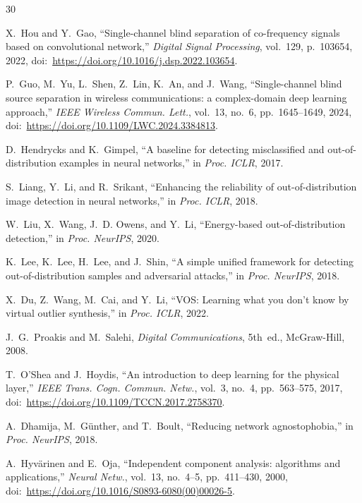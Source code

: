 \documentclass[review,12pt]{elsarticle}
\begin{document}
\begin{thebibliography}{30}\footnotesize

X.~Hou and Y.~Gao,
``Single-channel blind separation of co-frequency signals based on
convolutional network,''
\emph{Digital Signal Processing}, vol.~129, p.~103654, 2022,
doi:~\url{https://doi.org/10.1016/j.dsp.2022.103654}.

P.~Guo, M.~Yu, L.~Shen, Z.~Lin, K.~An, and J.~Wang,
``Single-channel blind source separation in wireless communications: a
complex-domain deep learning approach,''
\emph{IEEE Wireless Commun. Lett.}, vol.~13, no.~6, pp.~1645--1649,
2024, doi:~\url{https://doi.org/10.1109/LWC.2024.3384813}.

D.~Hendrycks and K.~Gimpel,
``A baseline for detecting misclassified and out-of-distribution
examples in neural networks,''
in \emph{Proc. ICLR}, 2017.

S.~Liang, Y.~Li, and R.~Srikant,
``Enhancing the reliability of out-of-distribution image detection in
neural networks,''
in \emph{Proc. ICLR}, 2018.

W.~Liu, X.~Wang, J.~D. Owens, and Y.~Li,
``Energy-based out-of-distribution detection,''
in \emph{Proc. NeurIPS}, 2020.

K.~Lee, K.~Lee, H.~Lee, and J.~Shin,
``A simple unified framework for detecting out-of-distribution samples
and adversarial attacks,''
in \emph{Proc. NeurIPS}, 2018.

X.~Du, Z.~Wang, M.~Cai, and Y.~Li,
``VOS: Learning what you don't know by virtual outlier synthesis,''
in \emph{Proc. ICLR}, 2022.

J.~G.~Proakis and M.~Salehi,
\emph{Digital Communications}, 5th~ed., McGraw-Hill, 2008.

T.~O'Shea and J.~Hoydis,
``An introduction to deep learning for the physical layer,''
\emph{IEEE Trans. Cogn. Commun. Netw.}, vol.~3, no.~4, pp.~563--575,
2017, doi:~\url{https://doi.org/10.1109/TCCN.2017.2758370}.

A.~Dhamija, M.~G{\"u}nther, and T.~Boult,
``Reducing network agnostophobia,''
in \emph{Proc. NeurIPS}, 2018.

A.~Hyv{\"a}rinen and E.~Oja,
``Independent component analysis: algorithms and applications,''
\emph{Neural Netw.}, vol.~13, no.~4--5, pp.~411--430, 2000,
doi:~\url{https://doi.org/10.1016/S0893-6080(00)00026-5}.


\end{thebibliography}
\end{document}
